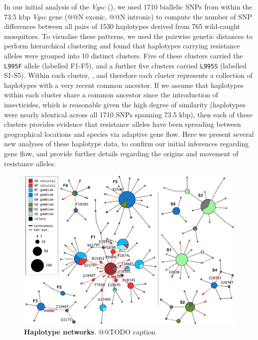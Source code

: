 \documentclass[a4paper,11pt,abstracton,hidelinks]{scrartcl}
\begin{document}
%
In our initial analysis of the \textit{Vgsc} (\cite{Ag1000gConsortium2017}), we used 1710 biallelic SNPs from within the 73.5 kbp \textit{Vgsc} gene (@@N exonic, @@N intronic) to compute the number of SNP differences between all pairs of 1530 haplotypes derived from 765 wild-caught mosquitoes.
%
To visualise these patterns, we used the pairwise genetic distances to perform hierarchical clustering and found that haplotypes carrying resistance alleles were grouped into 10 distinct clusters.
%
Five of these clusters carried the \texttt{L995F} allele (labelled F1-F5), and a further five clusters carried \texttt{L995S} (labelled S1-S5).
%
Within each cluster, , and therefore each cluster represents a collection of haplotypes with a very recent common ancestor.
%
If we assume that haplotypes within each cluster share a common ancestor since the introduction of insecticides, which is reasonable given the high degree of similarity (haplotypes were nearly identical across all 1710 SNPs spanning 73.5 kbp), then each of these clusters provides evidence that resistance alleles have been spreading between geographical locations and species via adaptive gene flow.
%
Here we present several new analyses of these haplotype data, to confirm our initial inferences regarding gene flow, and provide further details regarding the origins and movement of resistance alleles.
%


%
\begin{figure}[!b]
  \includegraphics[width=1.1\linewidth,center]{artwork/complete_networks.pdf}
  \caption{\textbf{Haplotype networks}. @@TODO caption}
  \label{fig:networks}
\end{figure}
\end{document}
